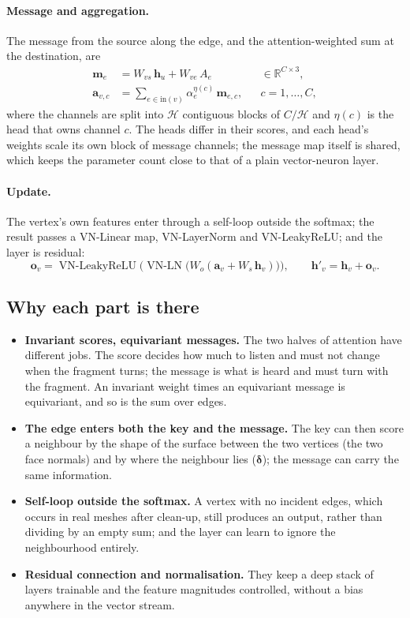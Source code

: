 \documentclass[11pt,a4paper]{article}
\theoremstyle{remark}
\newcommand{\R}{\mathbb{R}}
\begin{document}
\paragraph{Message and aggregation.} The message from the source along the edge, and the attention-weighted sum at the destination, are
\begin{align}
  \mathbf m_e&=W_{vs}\,\mathbf h_u+W_{ve}\,A_e &&\in\R^{C\times3},\\
  \mathbf a_{v,c}&=\sum_{e\in\mathrm{in}(v)}\alpha_e^{\eta(c)}\,\mathbf m_{e,c}, && c=1,\dots,C,
\end{align}
where the channels are split into $\mathcal H$ contiguous blocks of $C/\mathcal H$ and $\eta(c)$ is the head that owns channel $c$. The heads differ in their scores, and each head's weights scale its own block of message channels; the message map itself is shared, which keeps the parameter count close to that of a plain vector-neuron layer.

\paragraph{Update.} The vertex's own features enter through a self-loop outside the softmax; the result passes a VN-Linear map, VN-LayerNorm and VN-LeakyReLU; and the layer is residual:
\begin{equation}
  \mathbf o_v=\operatorname{VN\text{-}LeakyReLU}\Big(\operatorname{VN\text{-}LN}\big(W_o(\mathbf a_v+W_s\,\mathbf h_v)\big)\Big),\qquad
  \mathbf h'_v=\mathbf h_v+\mathbf o_v .
\end{equation}

\subsection{Why each part is there}
\begin{itemize}
  \item \textbf{Invariant scores, equivariant messages.} The two halves of attention have different jobs. The score decides how much to listen and must not change when the fragment turns; the message is what is heard and must turn with the fragment. An invariant weight times an equivariant message is equivariant, and so is the sum over edges.
  \item \textbf{The edge enters both the key and the message.} The key can then score a neighbour by the shape of the surface between the two vertices (the two face normals) and by where the neighbour lies ($\boldsymbol\delta$); the message can carry the same information.
  \item \textbf{Self-loop outside the softmax.} A vertex with no incident edges, which occurs in real meshes after clean-up, still produces an output, rather than dividing by an empty sum; and the layer can learn to ignore the neighbourhood entirely.
  \item \textbf{Residual connection and normalisation.} They keep a deep stack of layers trainable and the feature magnitudes controlled, without a bias anywhere in the vector stream.
\end{itemize}
\end{document}
